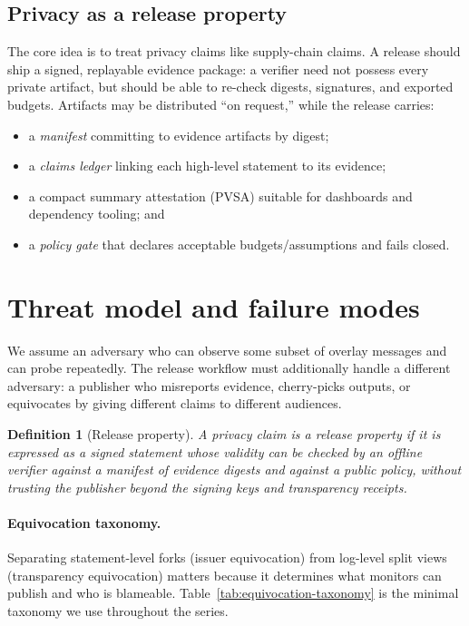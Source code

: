 \documentclass[11pt]{article}
\newtheorem{definition}{Definition}
\begin{document}
\subsection{Privacy as a release property}
The core idea is to treat privacy claims like supply-chain claims.
A release should ship a signed, replayable evidence package: a verifier need not possess every private artifact, but should be able to re-check digests, signatures, and exported budgets.
Artifacts may be distributed ``on request,'' while the release carries:
\begin{itemize}[leftmargin=1.2em]
\item a \emph{manifest} committing to evidence artifacts by digest;
\item a \emph{claims ledger} linking each high-level statement to its evidence;
\item a compact summary attestation (PVSA) suitable for dashboards and dependency tooling; and
\item a \emph{policy gate} that declares acceptable budgets/assumptions and fails closed.
\end{itemize}

\section{Threat model and failure modes}
We assume an adversary who can observe some subset of overlay messages and can probe repeatedly.
The release workflow must additionally handle a different adversary: a publisher who misreports evidence, cherry-picks outputs, or equivocates by giving different claims to different audiences.

\begin{definition}[Release property]
A privacy claim is a \emph{release property} if it is expressed as a signed statement whose validity can be checked by an offline verifier against a manifest of evidence digests and against a public policy, without trusting the publisher beyond the signing keys and transparency receipts.
\end{definition}

\paragraph{Equivocation taxonomy.}
Separating statement-level forks (issuer equivocation) from log-level split views (transparency equivocation) matters because it determines what monitors can publish and who is blameable.
Table~\ref{tab:equivocation-taxonomy} is the minimal taxonomy we use throughout the series.
\end{document}
